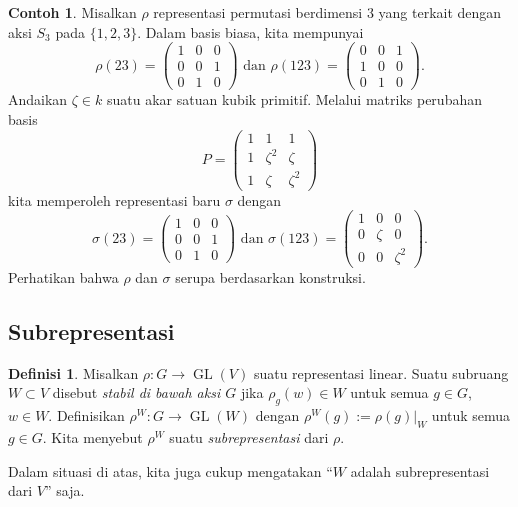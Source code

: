 \documentclass[12pt]{article}
\theoremstyle{plain}
\theoremstyle{definition}
\newtheorem{definition}[theorem]{Definisi}
\newtheorem{example}[theorem]{Contoh}
\theoremstyle{remark}
\numberwithin{equation}{section}
\begin{document}
\begin{example} \label{ex:S3_decomposition}
Misalkan $\rho$ representasi permutasi berdimensi $3$ yang terkait dengan
aksi $S_3$ pada $\{1,2,3\}$.
Dalam basis biasa, kita mempunyai
\[
\rho(23) = \begin{pmatrix} 1&0&0\\ 0&0&1 \\ 0&1&0 \end{pmatrix}
\textrm{ dan }
\rho(123) = \begin{pmatrix} 0&0&1\\1&0&0\\0&1&0 \end{pmatrix}.
\]
Andaikan $\zeta \in k$ suatu akar satuan kubik primitif.
Melalui matriks perubahan basis
\[
P = \begin{pmatrix} 1&1&1\\ 1&\zeta^2&\zeta\\1&\zeta&\zeta^2 \end{pmatrix} 
\]
kita memperoleh representasi baru $\sigma$ dengan
\[
\sigma(23) = \begin{pmatrix} 1&0&0\\ 0&0&1 \\ 0&1&0 \end{pmatrix}
\textrm{ dan }
\sigma(123) = \begin{pmatrix} 1&0&0\\ 0&\zeta&0 \\ 0&0&\zeta^2
\end{pmatrix} .  
\]
Perhatikan bahwa $\rho$ dan $\sigma$ serupa berdasarkan konstruksi.
\end{example}


\subsection{Subrepresentasi}

\begin{definition}
Misalkan $\rho : G \to \operatorname{GL}(V)$ suatu representasi linear.
Suatu subruang $W \subset V$ disebut \emph{stabil di bawah aksi $G$} jika
$\rho_g(w) \in W$ untuk semua $g \in G$, $w \in W$.
Definisikan $\rho^W : G \to \operatorname{GL}(W)$ dengan $\rho^W(g) := \rho(g)|_W$ untuk semua $g
\in G$.
Kita menyebut $\rho^W$ suatu \emph{subrepresentasi} dari $\rho$.
\end{definition}

Dalam situasi di atas, kita juga cukup mengatakan “$W$ adalah subrepresentasi dari $V$”
saja.
\end{document}
